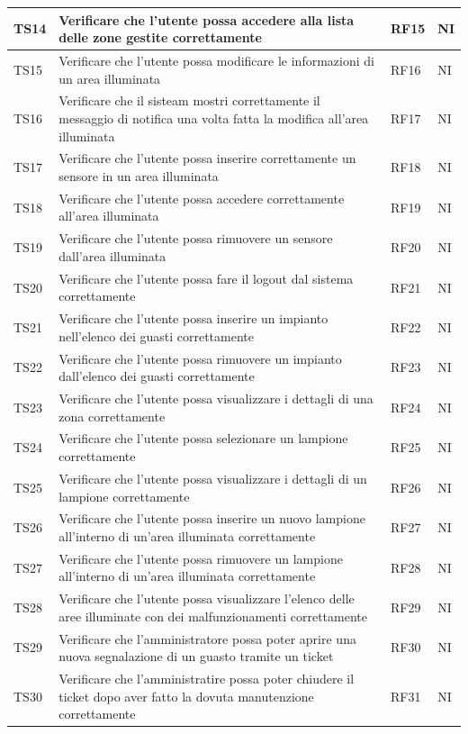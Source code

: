 \documentclass[12pt]{article}
\begin{document}
\begin{xltabular}{\linewidth}{|>{\hsize}X|>{\hsize}X|>{\hsize}X|>{\hsize}X|}
	\hline
	TS14	 & Verificare che l'utente possa accedere alla lista delle zone gestite correttamente	&	RF15	&	NI	\\
	\hline
	TS15	 & Verificare che l'utente possa modificare le informazioni di un area illuminata	&	RF16	&	NI	\\
	\hline
	TS16	 & Verificare che il sisteam mostri correttamente il messaggio di notifica una volta fatta la modifica all'area illuminata 	&	RF17	&	NI	\\
	\hline
	TS17	 & Verificare che l'utente possa inserire correttamente un sensore in un area illuminata	&	RF18	&	NI	\\
	\hline
	TS18	 & Verificare che l'utente possa accedere correttamente all'area illuminata	&	RF19	&	NI	\\
	\hline
	TS19	 & Verificare che l'utente possa rimuovere un sensore dall'area illuminata	&	RF20	&	NI	\\
	\hline
	TS20	 & Verificare che l'utente possa fare il logout dal sistema correttamente	&	RF21	&	NI	\\
	\hline
	TS21	 & Verificare che l'utente possa inserire un impianto nell'elenco dei guasti correttamente	&	RF22	&	NI	\\
	\hline
	TS22	 & Verificare che l'utente possa rimuovere un impianto dall'elenco dei guasti correttamente	&	RF23	&	NI	\\
	\hline
	TS23	 & Verificare che l'utente possa visualizzare i dettagli di una zona correttamente	&	RF24	&	NI	\\
	\hline
	TS24	 & Verificare che l'utente possa selezionare un lampione correttamente	&	RF25	&	NI	\\
	\hline
	TS25	 & Verificare che l'utente possa visualizzare i dettagli di un lampione correttamente	&	RF26	&	NI	\\
	\hline
	TS26	 & Verificare che l'utente possa inserire un nuovo lampione all'interno di un'area illuminata correttamente	&	RF27	&	NI	\\
	\hline
	TS27	 & Verificare che l'utente possa rimuovere un lampione all'interno di un'area illuminata correttamente	&	RF28	&	NI	\\
	\hline
	TS28	 & Verificare che l'utente possa visualizzare l'elenco delle aree illuminate con dei malfunzionamenti correttamente	&	RF29	&	NI	\\
	\hline
	TS29	 & Verificare che l'amministratore possa poter aprire una nuova segnalazione di un guasto tramite un ticket	&	RF30	&	NI	\\
	\hline
	TS30	 & Verificare che l'amministratire possa poter chiudere il ticket dopo aver fatto la dovuta manutenzione correttamente	&	RF31	&	NI	\\

\end{xltabular}
\end{document}
